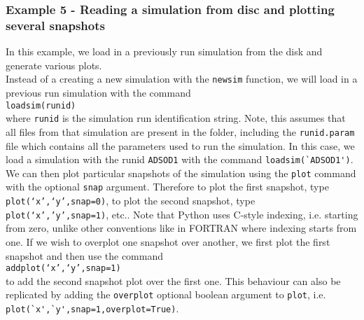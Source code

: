 \documentclass[a4paper]{article}
\newcommand{\var}[1]{\texttt{#1}}
\newcommand{\singlecommand}[1]{\\ \newline \indent \var{#1} \\ \newline \noindent}
\begin{document}
\subsubsection{Example 5 - Reading a simulation from disc and plotting several snapshots}
In this example, we load in a previously run simulation from the disk and generate various plots. \\






\noindent Instead of a creating a new simulation with the \var{newsim} function, we will load in a previous run simulation with the command \singlecommand{loadsim(runid)} where \var{runid} is the simulation run identification string.  Note, this assumes that all files from that simulation are present in the folder, including the \var{runid.param} file which contains all the parameters used to run the simulation.  In this case, we load a simulation with the runid \var{ADSOD1} with the command \lstinline{loadsim(`ADSOD1')}.  We can then plot particular snapshots of the simulation using the \var{plot} command with the optional \var{snap} argument.  Therefore to plot the first snapshot, type \var{plot(`x',`y',snap=0)}, to plot the second snapshot, type \var{plot(`x','y',snap=1)}, etc..  Note that Python uses C-style indexing, i.e. starting from zero, unlike other conventions like in FORTRAN where indexing starts from one.  If we wish to overplot one snapshot over another, we first plot the first snapshot and then use the command \singlecommand{addplot(`x',`y',snap=1)} to add the second snapshot plot over the first one.  This behaviour can also be replicated by adding the \var{overplot} optional boolean argument to \var{plot}, i.e. \lstinline{plot(`x',`y',snap=1,overplot=True)}.
\end{document}

